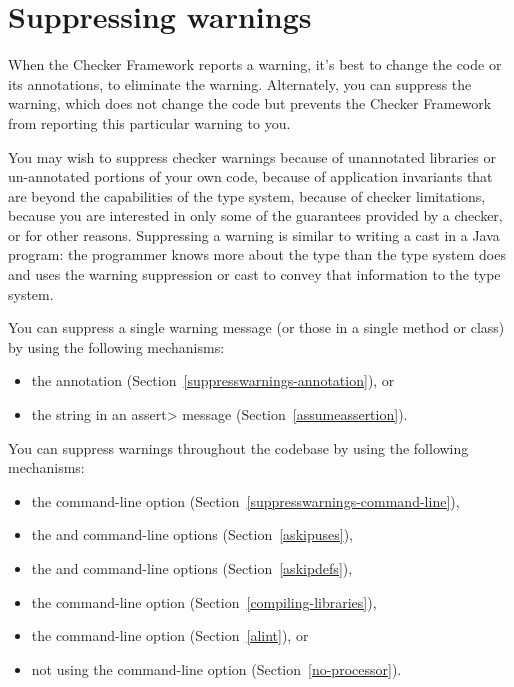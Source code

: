 \htmlhr
\chapter{Suppressing warnings\label{suppressing-warnings}}


When the Checker Framework reports a warning, it's best to change the code
or its annotations, to eliminate the warning.  Alternately, you can
suppress the warning, which does not change the code but prevents the
Checker Framework from reporting this particular warning to you.

You may wish to suppress checker warnings because of unannotated libraries
or un-annotated portions of your own code, because of application
invariants that are beyond the capabilities of the type system, because of
checker limitations, because you are interested in only some of the
guarantees provided by a checker, or for other reasons.
Suppressing a warning is similar to writing a cast in a Java
program:  the programmer knows more about the type than the type system does
and uses the warning suppression or cast to convey that information to the
type system.

You can suppress a single warning message (or those in a single method or
class) by using the following mechanisms:

\begin{itemize}
\item
  the  annotation
  (Section~\ref{suppresswarnings-annotation}), or
\item
  the  string in an \<assert> message (Section~\ref{assumeassertion}).
\end{itemize}

You can suppress warnings throughout the codebase by using the following mechanisms:

\begin{itemize}
\item
  the  command-line option (Section~\ref{suppresswarnings-command-line}),
\item
  the  and  command-line options (Section~\ref{askipuses}),
\item
  the  and  command-line options (Section~\ref{askipdefs}),
\item
  the  command-line
  option (Section~\ref{compiling-libraries}),
\item
  the  command-line option (Section~\ref{alint}), or
\item
  not using the  command-line option
  (Section~\ref{no-processor}).
\end{itemize}

